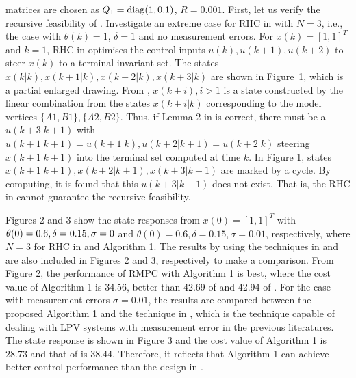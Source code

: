 \documentclass{singlecol-new}
\theoremstyle{TH}{
\newtheorem{lemma}{Lemma}
\newtheorem{theorem}[lemma]{Theorem}
\newtheorem{corrolary}[lemma]{Corrolary}
\newtheorem{conjecture}[lemma]{Conjecture}
\newtheorem{proposition}[lemma]{Proposition}
\newtheorem{claim}[lemma]{Claim}
\newtheorem{stheorem}[lemma]{Wrong Theorem}
\newtheorem{algorithm}{Algorithm}
}
\theoremstyle{THrm}{
\newtheorem{definition}{Definition}[section]
\newtheorem{question}{Question}[section]
\newtheorem{remark}{Remark}
\newtheorem{scheme}{Scheme}
}
\theoremstyle{THhit}{
\newtheorem{case}{Case}[section]
}
\begin{document}
matrices are chosen as $Q_1 = {\rm diag}(1,0.1)$, $R = 0.001$.
First, let us verify the recursive feasibility of
\cite{park2004crl}. Investigate an extreme case for RHC in
\cite{park2004crl} with $N=3$, i.e., the case with $\theta(k)=1$,
$\delta=1$ and no measurement errors. For $x(k)=[1,1]^T$ and $k=1$,
RHC in \cite{park2004crl} optimises the control inputs
$u(k),u(k+1),u(k+2)$ to steer $x(k)$ to a terminal invariant set.
The states $x(k|k),x(k+1|k),x(k+2|k),x(k+3|k)$ are shown in
Figure~1, which is a partial enlarged drawing. From
\cite{schuurmans2000robust}, $x(k+i),i>1$ is a state constructed by
the linear combination from the states $x(k+i|k)$ corresponding to
the model vertices $\{A1,B1\}, \{A2,B2\}$. Thus, if Lemma 2 in
\cite{park2004crl} is correct, there must be a $u(k+3|k+1)$ with
$u(k+1|k+1)=u(k+1|k), u(k+2|k+1)=u(k+2|k)$ steering $x(k+1|k+1)$
into the terminal set computed at time $k$. In Figure 1, states
$x(k+1|k+1),x(k+2|k+1),x(k+3|k+1)$ are marked by a cycle. By
computing, it is found that this $u(k+3|k+1)$ does not exist. That
is, the RHC in \cite{park2004crl} cannot guarantee the recursive
feasibility.



\noindent Figures 2 and 3 show the state responses from
$x(0)=[1,1]^T$ with $\theta(0)=0.6, \break \delta=0.15, \sigma=0$
and $\theta(0)=0.6, \delta=0.15, \sigma=0.01$, respectively, where
$N=3$ for RHC in \cite{park2004crl} and Algorithm 1. The results by
using the techniques in \cite{lu2000quasi} and \cite{Kothare} are
also included in Figures 2 and 3, respectively to make a comparison.
From Figure 2, the performance of RMPC with Algorithm 1 is best,
where the cost value of Algorithm 1 is 34.56, better than 42.69 of
\cite{lu2000quasi} and 42.94 of \cite{park2004crl}. For the case
with measurement errors $\sigma=0.01$, the results are compared
between the proposed Algorithm 1 and the technique in
\cite{Kothare}, which is the technique capable of dealing with LPV
systems with measurement error in the previous literatures. The
state response is shown in Figure 3 and the cost value of Algorithm
1 is 28.73 and that of \cite{Kothare} is 38.44. Therefore, it
reflects that Algorithm 1 can achieve better control performance
than the design in \cite{Kothare}.

\end{document}
